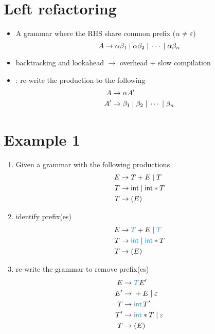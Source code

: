 \documentclass[10pt,a4paper,landscape]{article}
\begin{document}
\begin{multicols*}{3}
\section*{Left refactoring}
\begin{itemize}
\item A grammar where the RHS share common prefix ($\alpha \neq \varepsilon$)
\[
  A\to \alpha\beta_1 \;|\; \alpha\beta_2 \;|\; \cdots \;|\; \alpha\beta_n
\]
\item backtracking and lookahead $\to$ overhead + slow compilation
\item {}: re-write the production to the following
  \begin{align*}
    A\to &\; \alpha A' \\
    A'\to &\; \beta_1 \;|\; \beta_2 \;|\; \cdots \;|\; \beta_n
  \end{align*}
\end{itemize}
\section*{Example 1}
\begin{enumerate}[start=0]
\item Given a grammar with the following productions
  \begin{align*}
    E\to &\; T + E \;|\; T \\
    T\to &\; \textsf{int} \;|\; \textsf{int} * T \\
    T\to &\; (E)
  \end{align*}
\item identify  prefix(es)
  \begin{align*}
    E\to &\; \mb{T} + E \gor \mb{T} \\
    T\to &\; \mb{\textsf{int}} \gor \mb{\textsf{int}} * T \\
    T\to &\; (E)
  \end{align*}
\item re-write the grammar to remove  prefix(es)
  \begin{align*}
    E\to &\; \mb{T} E'\\
    E'\to &\; + E \gor \varepsilon \\
    T\to &\; \mb{\textsf{int}}\,T' \\
    T'\to &\; \mb{\textsf{int}} * T \gor \varepsilon \\
    T\to &\; (E)
  \end{align*}
\end{enumerate}

\end{multicols*}
\end{document}
